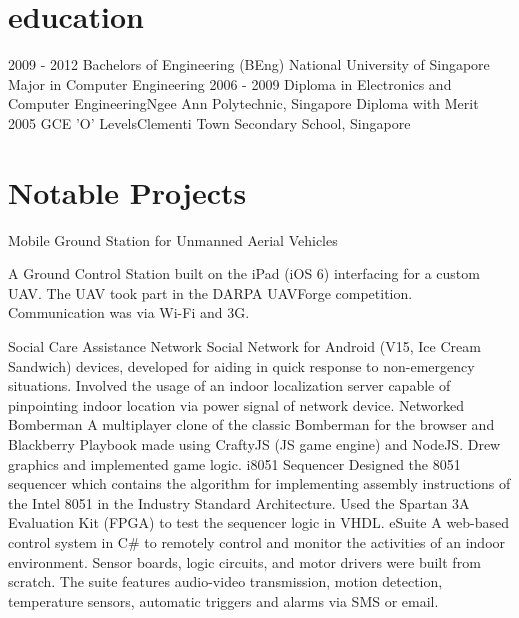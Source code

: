 \documentclass[]{friggeri-cv}
\begin{document}
\section{education}

\begin{entrylist}
	\entry
	{2009 - 2012}
	{Bachelors of Engineering (BEng)}
	{National University of Singapore}
	{
		Major in Computer Engineering
	}
	\entry
	{2006 - 2009}
	{Diploma in Electronics and Computer Engineering}{Ngee Ann Polytechnic, Singapore}
	{
		Diploma with Merit\\
	}
	\entry
	{2005}
	{GCE 'O' Levels}{Clementi Town Secondary School, Singapore}
	{}
\end{entrylist}
\pagebreak
\section{Notable Projects}
\begin{entrylist}
	{Mobile Ground Station for Unmanned Aerial Vehicles}
	{}
	{
		A Ground Control Station built on the iPad (iOS 6) interfacing for a custom UAV. The UAV took part in the DARPA UAVForge competition. Communication was via Wi-Fi and 3G.

	}
	{Social Care Assistance Network}
	{}
	{Social Network for Android (V15, Ice Cream Sandwich) devices, developed for aiding in quick response to non-emergency situations. Involved the usage of an indoor localization server capable of pinpointing indoor location via power signal of network device.}
	{Networked Bomberman}
	{}
	{A multiplayer clone of the classic Bomberman for the browser and Blackberry Playbook made using CraftyJS (JS game engine) and NodeJS. Drew graphics and implemented game logic. }
	{i8051 Sequencer}
	{}
	{Designed the 8051 sequencer which contains the algorithm for implementing assembly instructions of the Intel 8051 in the Industry Standard Architecture. Used the Spartan 3A Evaluation Kit (FPGA) to test the sequencer logic in VHDL.}
	{eSuite}
	{}
	{A web-based control system in C\# to remotely control and monitor the activities of an indoor environment. Sensor boards, logic circuits, and motor drivers were built from scratch. The suite features audio-video transmission, motion detection, temperature sensors, automatic triggers and alarms via SMS or email.}

\end{entrylist}
\end{document}

